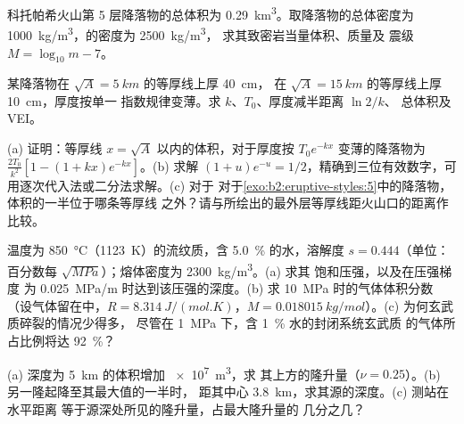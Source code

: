 \begin{exercise}[$\star$]\label{exo:b2:eruptive-styles:4}
科托帕希火山第 5 层降落物的总体积为 \qty{0.29}{km^3}。取降落物的总体密度为
\qty{1000}{kg/m^3}，的密度为 \qty{2500}{kg/m^3}，
求其致密岩当量体积、质量及
震级 $M = \log_{10}m - 7$。
\end{exercise}

\begin{exercise}[$\star\star$]\label{exo:b2:eruptive-styles:5}
某降落物在 $\sqrt A = \qty{5}{km}$ 的等厚线上厚 \qty{40}{cm}，
在 $\sqrt A = \qty{15}{km}$ 的等厚线上厚 \qty{10}{cm}，厚度按单一
指数规律变薄。求 $k$、$T_0$、厚度减半距离 $\ln 2/k$、
总体积及 VEI。
\end{exercise}

\begin{exercise}[$\star\star$]\label{exo:b2:eruptive-styles:6}
(a) 证明：等厚线 $x = \sqrt A$ 以内的体积，对于厚度按
$T_0e^{-kx}$ 变薄的降落物为 $\frac{2T_0}{k^2}[1 - (1 + kx)e^{-kx}]$。(b) 求解 $(1 + u)e^{-u} =
1/2$，精确到三位有效数字，可用逐次代入法或二分法求解。(c) 对于
对于\cref{exo:b2:eruptive-styles:5}中的降落物，体积的一半位于哪条等厚线
之外？请与所绘出的最外层等厚线距火山口的距离作比较。
\end{exercise}

\begin{exercise}[$\star\star$]\label{exo:b2:eruptive-styles:7}
温度为 \qty{850}{\celsius}（\qty{1123}{K}）的流纹质，含
\qty{5.0}{\percent} 的水，溶解度 $s = 0.444$（单位：百分数每
$\sqrt{\unit{MPa}}$）；熔体密度为 \qty{2300}{kg/m^3}。(a) 求其
饱和压强，以及在压强梯度
为 \qty{0.025}{MPa/m} 时达到该压强的深度。(b) 求
\qty{10}{MPa} 时的气体体积分数（设气体留在中，$R = \qty{8.314}{J/(mol.K)}$，$M =
\qty{0.018015}{kg/mol}$）。(c) 为何玄武质碎裂的情况少得多，
尽管在 \qty{1}{MPa} 下，含 \qty{1}{\percent} 水的封闭系统玄武质
的气体所占比例将达 \qty{92}{\percent}？
\end{exercise}

\begin{exercise}[$\star\star$]\label{exo:b2:eruptive-styles:8}
(a) 深度为 \qty{5}{km} 的体积增加 \qty{e7}{m^3}，求
其上方的隆升量（$\nu = 0.25$）。(b) 另一隆起降至其最大值的一半时，
距其中心 \qty{3.8}{km}，求其源的深度。(c) 测站在水平距离
等于源深处所见的隆升量，占最大隆升量的
几分之几？
\end{exercise}

